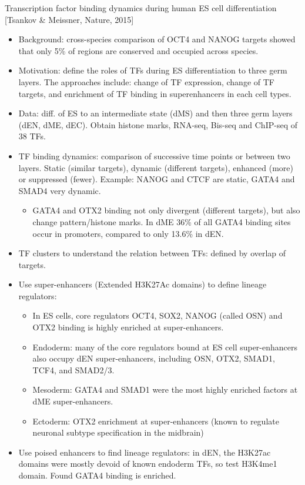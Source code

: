 \documentclass{report}
\begin{document}
Transcription factor binding dynamics during human ES cell differentiation [Tsankov \& Meissner, Nature, 2015]
\begin{itemize}
	\item Background: cross-species comparison of OCT4 and NANOG targets showed that only 5\% of regions are conserved and occupied across species. 
	\item Motivation: define the roles of TFs during ES differentiation to three germ layers. The approaches include: change of TF expression, change of TF targets, and enrichment of TF binding in superenhancers in each cell types. 
	\item Data: diff. of ES to an intermediate state (dMS) and then three germ layers (dEN, dME, dEC). Obtain histone marks, RNA-seq, Bis-seq and ChIP-seq of 38 TFs. 
	\item TF binding dynamics: comparison of successive time points or between two layers. Static (similar targets), dynamic (different targets), enhanced (more) or suppressed (fewer). Example: NANOG and CTCF are static, GATA4 and SMAD4 very dynamic.
	\begin{itemize}
		\item GATA4 and OTX2 binding not only divergent (different targets), but also change pattern/histone marks. In dME 36\% of all GATA4 binding sites occur in promoters, compared to only 13.6\% in dEN.  
	\end{itemize}
	\item TF clusters to understand the relation between TFs: defined by overlap of targets. 
	\item Use super-enhancers (Extended H3K27Ac domains) to define lineage regulators: 
	\begin{itemize}
		\item In ES cells, core regulators OCT4, SOX2, NANOG (called OSN) and OTX2 binding is highly enriched at super-enhancers. 
		\item Endoderm: many of the core regulators bound at ES cell super-enhancers also occupy dEN super-enhancers, including OSN, OTX2, SMAD1, TCF4, and SMAD2/3.
		\item Mesoderm: GATA4 and SMAD1 were the most highly enriched factors at dME super-enhancers. 
		\item Ectoderm: OTX2 enrichment at super-enhancers (known to regulate neuronal subtype specification in the midbrain)
	\end{itemize}
	\item Use poised enhancers to find lineage regulators: in dEN, the H3K27ac domains were mostly devoid of known endoderm TFs, so test H3K4me1 domain. Found GATA4 binding is enriched.  

\end{itemize}
\end{document}
